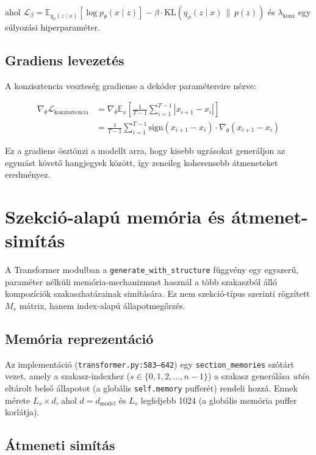 ahol $\mathcal{L}_{\beta} = \mathbb{E}_{q_\phi(z \mid x)}[\log p_\theta(x \mid z)] - \beta \cdot \text{KL}(q_\phi(z \mid x) \, \| \, p(z))$ és $\lambda_{\text{konz}}$ egy súlyozási hiperparaméter.

\subsection{Gradiens levezetés}

A konzisztencia veszteség gradiense a dekóder paramétereire nézve:

\begin{align}
\nabla_\theta \mathcal{L}_{\text{konzisztencia}} &= \nabla_\theta \mathbb{E}_{x} \left[ \frac{1}{T-1} \sum_{i=1}^{T-1} |x_{i+1} - x_i| \right] \\
&= \frac{1}{T-1} \sum_{i=1}^{T-1} \text{sign}(x_{i+1} - x_i) \cdot \nabla_\theta (x_{i+1} - x_i)
\end{align}

Ez a gradiens ösztönzi a modellt arra, hogy kisebb ugrásokat generáljon az egymást követő hangjegyek között, így zeneileg koherensebb átmeneteket eredményez.

\section{Szekció-alapú memória és átmenet-simítás}
\label{proof:memory_mechanism}

A Transformer modulban a \texttt{generate\_with\_structure} függvény egy egyszerű, paraméter nélküli memória-mechanizmust használ a több szakaszból álló kompozíciók szakaszhatárainak simítására. Ez nem szekció-típus szerinti rögzített $M_s$ mátrix, hanem index-alapú állapotmegőrzés.

\subsection{Memória reprezentáció}

Az implementáció (\texttt{transformer.py:583--642}) egy \texttt{section\_memories} szótárt vezet, amely a szakasz-indexhez ($s \in \{0, 1, 2, \ldots, n-1\}$) a szakasz generálása \emph{után} eltárolt belső állapotot (a globális \texttt{self.memory} pufferét) rendeli hozzá. Ennek mérete $L_s \times d$, ahol $d = d_{\text{model}}$ és $L_s$ legfeljebb 1024 (a globális memória puffer korlátja).

\subsection{Átmeneti simítás}

